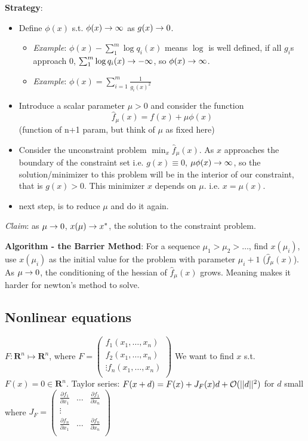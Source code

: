 \textbf{Strategy}:
\begin{itemize}
\item Define $\phi(x)$ s.t. $\phi(x)\rightarrow \infty$ as $g(x) \rightarrow 0$.
  \begin{itemize}
  \item \emph{Example}: $\phi(x) - \sum_1^m \log q_i(x)$ means $\log$ is
  well defined, if all $g_i$s approach 0, $\sum_1^m \log q_i(x)\rightarrow
  -\infty$, so $\phi(x) \rightarrow \infty$.
\item \emph{Example}: $\phi(x) = \sum_{i=1}^m \frac{1}{g_i(x)^2}$
  \end{itemize}
\item Introduce a scalar parameter $\mu>0$ and consider the function
  $$\hat f_\mu(x)=f(x) + \mu \phi(x)$$ (function of n+1 param, but think of $\mu$ as fixed here)
\item Consider the unconstraint problem $\min_x \hat f_\mu(x)$. As
$x$ approaches the boundary of the constraint set i.e. $g(x)\equiv 0$,
$\mu\phi(x)\rightarrow \infty$, so the solution/minimizer to this problem will be in
the interior of our constraint, that is $g(x)>0$. This minimizer $x$
depends on $\mu$. i.e. $x=\mu(x)$.
\item next step, is to reduce $\mu$ and do it again.

\end{itemize}
\emph{Claim}: as $\mu\rightarrow 0$, $x(\mu)\rightarrow x^*$, the solution to the
constraint problem.

\textbf{Algorithm - the Barrier Method}: For a sequence $\mu_1 > \mu_2 > \dots$, find $x(\mu_i)$, use
$x(\mu_i)$ as the initial value for the problem with parameter
$\mu_i+1$ ($\hat f_\mu(x)$). As $\mu\rightarrow 0$, the conditioning of the hessian of $\hat
f_\mu(x)$ grows. Meaning makes it harder for newton's method to solve.

\subsection{Nonlinear equations}
$F:\mathbf{R}^n \mapsto \mathbf{R}^n$, where $F=
\begin{pmatrix}
f_1(x_1, \dots, x_n)  \\
f_2(x_1, \dots, x_n)  \\
\vdots
f_n(x_1, \dots, x_n)  \\
\end{pmatrix}$
We want to find $x$ s.t. $F(x) = 0\in\mathbf{R}^n$.
Taylor series: $F(x+d) = F(x) + J_F(x)d + \mathcal{O}(||d||^2)$ for
$d$ small where $J_F =
\begin{pmatrix}
\frac{\partial f_1}{\partial x_1}&\dots &\frac{\partial f_1}{\partial
  x_n}\\
\vdots\\
\frac{\partial f_n}{\partial x_1}&\dots &\frac{\partial f_n}{\partial
  x_n}\\
\end{pmatrix}$

